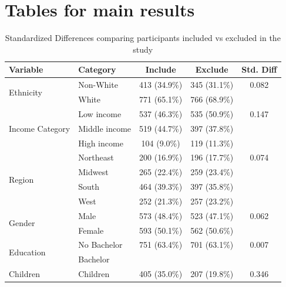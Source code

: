 \documentclass[12pt]{article}
\begin{document}
\clearpage










\section{Tables for main results}

\begin{table}[htbp]
\centering
\footnotesize
\caption{Standardized Differences comparing participants included vs excluded in the study}
\label{tab:Incomplete}
\begin{threeparttable}
\begin{tabular}{llccc}
\toprule
\textbf{Variable} & \textbf{Category} & \textbf{Include} & \textbf{Exclude} & \textbf{Std. Diff} \\
\midrule
\multirow{2}{*}{Ethnicity} & Non-White & 413 (34.9\%) & 345 (31.1\%) & 0.082 \\
                           & White     & 771 (65.1\%) & 766 (68.9\%) & \\
\midrule
\multirow{3}{*}{Income Category} & Low income    & 537 (46.3\%) & 535 (50.9\%) & 0.147 \\
                                 & Middle income & 519 (44.7\%) & 397 (37.8\%) & \\
                                 & High income   & 104 (9.0\%)  & 119 (11.3\%) & \\
\midrule
\multirow{4}{*}{Region} & Northeast & 200 (16.9\%) & 196 (17.7\%) & 0.074 \\
                        & Midwest   & 265 (22.4\%) & 259 (23.4\%) & \\
                        & South     & 464 (39.3\%) & 397 (35.8\%) & \\
                        & West      & 252 (21.3\%) & 257 (23.2\%) & \\
\midrule
\multirow{2}{*}{Gender} & Male   & 573 (48.4\%) & 523 (47.1\%) & 0.062 \\
                        & Female & 593 (50.1\%) & 562 (50.6\%) & \\
\midrule
\multirow{2}{*}{Education} & No Bachelor & 751 (63.4\%) & 701 (63.1\%) & 0.007 \\
                           & Bachelor    &             &             & \\
\midrule
\multirow{2}{*}{Children} & Children     & 405 (35.0\%) & 207 (19.8\%) & 0.346 \\

\end{tabular}
\end{threeparttable}
\end{table}
\end{document}
